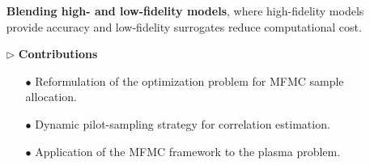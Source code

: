 \documentclass{beamer}
\begin{document}
\begin{frame}[t]
\begin{itemize}[leftmargin=5pt]
{\begin{itemize}[leftmargin=15pt]
                \textcolor{mybrown1}{{\bf Blending high- and low-fidelity models}, where high-fidelity models provide accuracy and low-fidelity surrogates reduce computational cost.}

                
                

                

                
        
            \end{itemize}
            }
            \vspace{2mm}
            \item[$\triangleright$] \textcolor{myblue3}{\bf Contributions}
                {\fontsize{9}{9}\selectfont
                \begin{itemize}[leftmargin=15pt] 
                \item[\textcolor{myblue3}{$\bullet$}] Reformulation of the optimization problem for MFMC sample allocation.
                \item[\textcolor{myblue3}{$\bullet$}] Dynamic pilot-sampling strategy for correlation estimation. 
                \item[\textcolor{myblue3}{$\bullet$}] Application of the MFMC framework to the plasma problem. 
                \end{itemize}
                }
    \end{itemize}
\end{frame}
\end{document}
